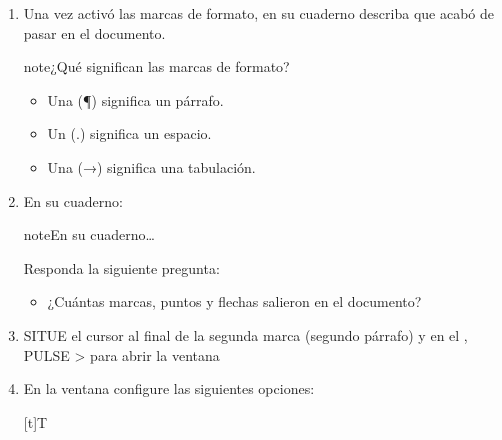 \documentclass[letterpaper,10pt,spanish]{sphinxmanual}
\begin{document}
\begin{enumerate}
\item {} 
\sphinxAtStartPar
Una vez activó las marcas de formato, en su cuaderno describa que acabó de pasar en el documento.

\begin{sphinxadmonition}{note}{¿Qué significan las marcas de formato?}
\begin{itemize}
\item {} 
\sphinxAtStartPar
Una  (¶) significa un párrafo.

\item {} 
\sphinxAtStartPar
Un  (.) significa un espacio.

\item {} 
\sphinxAtStartPar
Una  (→) significa una tabulación.

\end{itemize}
\end{sphinxadmonition}

\item {} 
\sphinxAtStartPar
En su cuaderno:

\begin{sphinxadmonition}{note}{En su cuaderno…}

\sphinxAtStartPar
Responda la siguiente pregunta:
\begin{itemize}
\item {} 
\sphinxAtStartPar
¿Cuántas marcas, puntos y flechas salieron en el documento?

\end{itemize}
\end{sphinxadmonition}

\item {} 
\sphinxAtStartPar
SITUE el cursor al final de la segunda marca (segundo párrafo) y en el , PULSE  >  para abrir la ventana 

\item {} 
\sphinxAtStartPar
En la ventana  configure las siguientes opciones:


\begin{savenotes}\sphinxattablestart
\sphinxthistablewithglobalstyle
\centering
\begin{tabulary}{\linewidth}[t]{T}
\sphinxtoprule
\sphinxtableatstartofbodyhook

\begin{sphinxfigure-in-table}
\centering


\end{sphinxfigure-in-table}
\end{tabulary}
\end{savenotes}
\end{enumerate}
\end{document}
